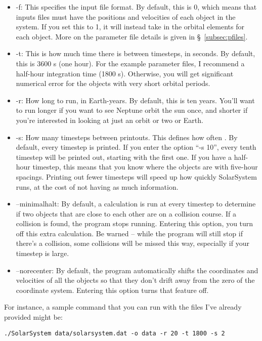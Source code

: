 \documentclass{article}
\begin{document}
\begin{itemize}
	\item -f: This specifies the input file format.  By default, this is 0, which means that inputs files must have the positions and velocities of each object in the system.  If you set this to 1, it will instead take in the orbital elements for each object.  More on the parameter file details is given in \S~\ref{subsec:pfiles}.
	\item -t: This is how much time there is between timesteps, in seconds.  By default, this is 3600 s (one hour).  For the example parameter files, I recommend a half-hour integration time (1800 s).  Otherwise, you will get significant numerical error for the objects with very short orbital periods.
	\item -r: How long to run, in Earth-years.  By default, this is ten years.  You'll want to run longer if you want to see Neptune orbit the sun once, and shorter if you're interested in looking at just an orbit or two or Earth.
	\item -s: How many timesteps between printouts.  This defines how often .  By default, every timestep is printed.  If you enter the option ``-s 10'', every tenth timestep will be printed out, starting with the first one.  If you have a half-hour timestep, this means that you know where the objects are with five-hour spacings.  Printing out fewer timesteps will speed up how quickly SolarSystem runs, at the cost of not having as much information.
	\item --minimalhalt: By default, a calculation is run at every timestep to determine if two objects that are close to each other are on a collision course.  If a collision is found, the program stops running.  Entering this option, you turn off this extra calculation.  Be warned -- while the program will still stop if there's a collision, some collisions will be missed this way, especially if your timestep is large.
	\item --norecenter: By default, the program automatically shifts the coordinates and velocities of all the objects so that they don't drift away from the zero of the coordinate system.  Entering this option turns that feature off.
\end{itemize}

For instance, a sample command that you can run with the files I've already provided might be:

\begin{lstlisting}
./SolarSystem data/solarsystem.dat -o data -r 20 -t 1800 -s 2
\end{lstlisting}
\end{document}
